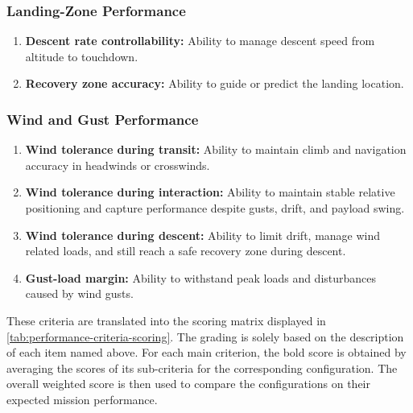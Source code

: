 \subsubsection*{Landing-Zone Performance}
\begin{enumerate}
    \item \textbf{Descent rate controllability:} Ability to manage descent speed from altitude to touchdown.
    \item \textbf{Recovery zone accuracy:} Ability to guide or predict the landing location.
\end{enumerate}

\subsubsection*{Wind and Gust Performance}
\begin{enumerate}
    \item \textbf{Wind tolerance during transit:} Ability to maintain climb and navigation accuracy in headwinds or crosswinds.
    \item \textbf{Wind tolerance during interaction:} Ability to maintain stable relative positioning and capture performance despite gusts, drift, and payload swing.
    \item \textbf{Wind tolerance during descent:} Ability to limit drift, manage wind related loads, and still reach a safe recovery zone during descent.
    \item \textbf{Gust-load margin:} Ability to withstand peak loads and disturbances caused by wind gusts.
\end{enumerate}

These criteria are translated into the scoring matrix displayed in \autoref{tab:performance-criteria-scoring}. The grading is solely based on the description of each item named above. For each main criterion, the bold score is obtained by averaging the scores of its sub-criteria for the corresponding configuration. The overall weighted score is then used to compare the configurations on their expected mission performance.


